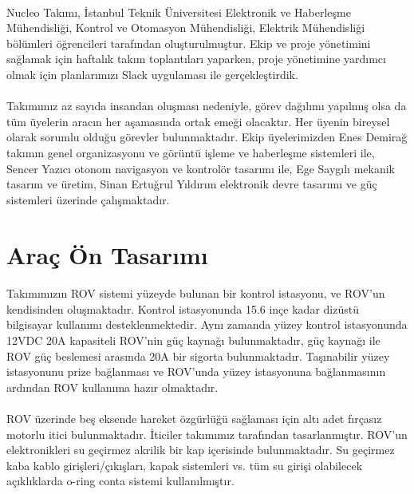 \documentclass[12pt]{article}
\begin{document}
\begin{justify} %
\paragraph{} Nucleo Takımı, İstanbul Teknik Üniversitesi Elektronik ve Haberleşme Mühendisliği, Kontrol ve Otomasyon Mühendisliği, Elektrik Mühendisliği bölümleri öğrencileri tarafından oluşturulmuştur. Ekip ve proje yönetimini sağlamak için haftalık takım toplantıları yaparken, proje yönetimine yardımcı olmak için planlarımızı Slack uygulaması ile gerçekleştirdik.
\end{justify}
\begin{justify}
\paragraph{} Takımımız az sayıda insandan oluşması nedeniyle, görev dağılımı yapılmış olsa da tüm üyelerin aracın her aşamasında ortak emeği olacaktır. Her üyenin bireysel olarak sorumlu olduğu görevler bulunmaktadır. Ekip üyelerimizden Enes Demirağ takımın genel organizasyonu ve görüntü işleme ve haberleşme sistemleri ile, Sencer Yazıcı otonom navigasyon ve kontrolör tasarımı ile, Ege Saygılı mekanik tasarım ve üretim, Sinan Ertuğrul Yıldırım elektronik devre tasarımı ve güç sistemleri üzerinde çalışmaktadır.
\end{justify}

\newpage

\section{Araç Ön Tasarımı}

\begin{justify}
\paragraph{} Takımımızın ROV sistemi yüzeyde bulunan bir kontrol istasyonu, ve ROV'un kendisinden oluşmaktadır. Kontrol istasyonunda 15.6 inçe kadar dizüstü bilgisayar kullanımı desteklenmektedir. Aynı zamanda yüzey kontrol istasyonunda 12VDC 20A kapasiteli ROV'nin güç kaynağı bulunmaktadır, güç kaynağı ile ROV güç beslemesi arasında 20A bir sigorta bulunmaktadır. Taşınabilir yüzey istasyonunu prize bağlanması ve ROV'unda yüzey istasyonuna bağlanmasının ardından ROV kullanıma hazır olmaktadır.
\end{justify}

\begin{justify}
\paragraph{} ROV üzerinde beş eksende hareket özgürlüğü sağlaması için altı adet fırçasız motorlu itici bulunmaktadır. İticiler takımımız tarafından tasarlanmıştır. ROV'un elektronikleri su geçirmez akrilik bir kap içerisinde bulunmaktadır. Su geçirmez kaba kablo girişleri/çıkışları, kapak sistemleri vs. tüm su girişi olabilecek açıklıklarda o-ring conta sistemi kullanılmıştır. 
\end{justify}
\end{document}

